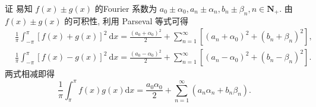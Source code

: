 \documentclass[a4paper,11pt,UTF8]{article}
\begin{document}
证 易知 $\displaystyle f(x) \pm g(x)$ 的Fourier 系数为 $a_0 \pm \alpha_0, a_n \pm \alpha_n, b_n \pm \beta_n, n \in \mathbf{N}_{+}$. 由 $\displaystyle f(x) \pm g(x)$ 的可积性, 利用 Parseval 等式可得
$$
\begin{aligned}
	& \frac{1}{\pi} \int_{-\pi}^\pi[f(x)+g(x)]^2 \mathrm{~d} x=\frac{\left(a_0+\alpha_0\right)^2}{2}+\sum_{n=1}^{\infty}\left[\left(a_n+\alpha_0\right)^2+\left(b_n+\beta_n\right)^2\right], \\
	& \frac{1}{\pi} \int_{-\pi}^\pi[f(x)-g(x)]^2 \mathrm{~d} x=\frac{\left(a_0-\alpha_0\right)^2}{2}+\sum_{n=1}^{\infty}\left[\left(a_n-\alpha_0\right)^2+\left(b_n-\beta_n\right)^2\right] .
\end{aligned}
$$
两式相减即得
$$
\frac{1}{\pi} \int_\pi^\pi f(x) g(x) \mathrm{d} x=\frac{a_0 \alpha_0}{2}+\sum_{n=1}^{\infty}\left(a_n \alpha_n+b_n \beta_n\right) .
$$
\end{document}
